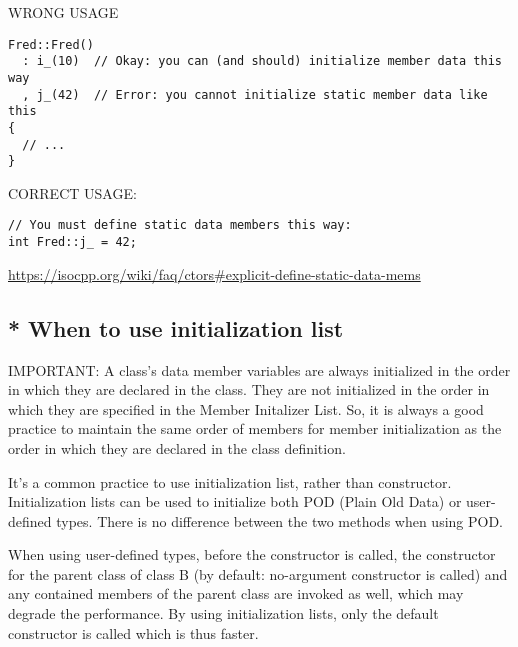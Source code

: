 WRONG USAGE
\begin{verbatim}
Fred::Fred()
  : i_(10)  // Okay: you can (and should) initialize member data this way
  , j_(42)  // Error: you cannot initialize static member data like this
{
  // ...
}
\end{verbatim}

CORRECT USAGE:
\begin{verbatim}
// You must define static data members this way:
int Fred::j_ = 42;
\end{verbatim}
\url{https://isocpp.org/wiki/faq/ctors#explicit-define-static-data-mems}


\subsection{ * When to use initialization list}

IMPORTANT:
A class's data member variables are always initialized in the order in which
they are declared in the class.
They are not initialized in the order in which they are specified in the Member
Initalizer List. So, it 
is always a good practice to maintain the same order of members for member
initialization as the order in which they are declared in the class definition.

It's a common practice to use initialization list, rather than constructor.
Initialization lists can be used to initialize both POD (Plain Old Data) or
user-defined types. There is no difference between the two methods when using
POD. 

When using user-defined types, before the constructor is called, the constructor
for the parent class of class B (by default: no-argument constructor is called)
and any contained members of the parent class are invoked as well, which may
degrade the performance. By using initialization lists, only the default
constructor is called which is thus faster.

